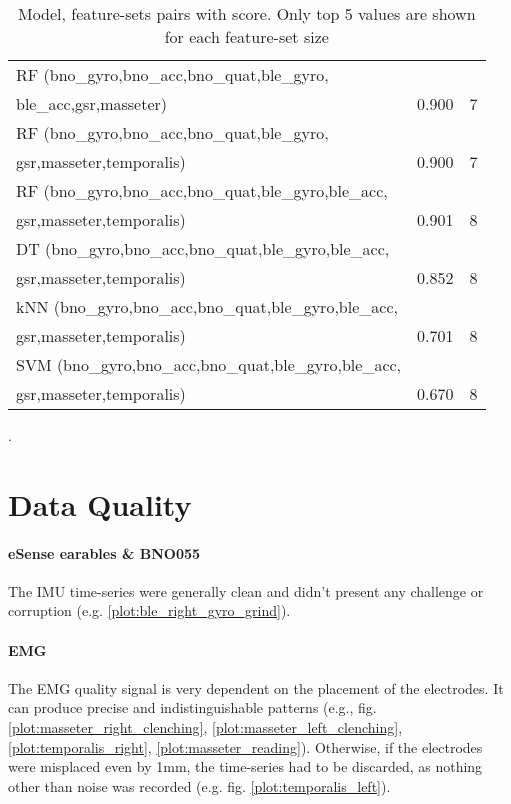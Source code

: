 \begin{table}[h!]
\begin{tabular}{lrr}
            RF (bno\_gyro,bno\_acc,bno\_quat,ble\_gyro,\\ble\_acc,gsr,masseter) &  0.900 &                 7 \\
         RF (bno\_gyro,bno\_acc,bno\_quat,ble\_gyro,\\gsr,masseter,temporalis) &  0.900 &                 7 \\
 RF (bno\_gyro,bno\_acc,bno\_quat,ble\_gyro,ble\_acc,\\gsr,masseter,temporalis) &  0.901 &                 8 \\
 DT (bno\_gyro,bno\_acc,bno\_quat,ble\_gyro,ble\_acc,\\gsr,masseter,temporalis) &  0.852 &                 8 \\
kNN (bno\_gyro,bno\_acc,bno\_quat,ble\_gyro,ble\_acc,\\gsr,masseter,temporalis) &  0.701 &                 8 \\
SVM (bno\_gyro,bno\_acc,bno\_quat,ble\_gyro,ble\_acc,\\gsr,masseter,temporalis) &  0.670 &                 8 \\
\bottomrule
\end{tabular}


\caption{Model, feature-sets pairs with score. Only top 5 values are shown for each feature-set size}.
\label{table:top_5_per_group}
\end{table}

\section{Data Quality}

\paragraph{eSense earables \& BNO055}

The IMU time-series were generally clean and didn't present any challenge or corruption (e.g. \ref{plot:ble_right_gyro_grind}).

\paragraph{EMG}

The EMG quality signal is very dependent on the placement of the electrodes. It can produce precise and indistinguishable patterns (e.g., fig. \ref{plot:masseter_right_clenching}, \ref{plot:masseter_left_clenching}, \ref{plot:temporalis_right}, \ref{plot:masseter_reading}). Otherwise, if the electrodes were misplaced even by 1mm, the time-series had to be discarded, as nothing other than noise was recorded (e.g. fig. \ref{plot:temporalis_left}).

